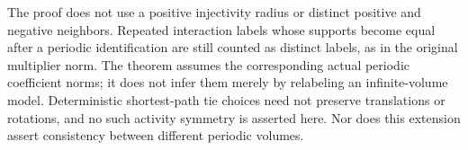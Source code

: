 \documentclass[11pt]{article}
\theoremstyle{remark}\newtheorem{remark}[theorem]{Remark}
\begin{document}
The proof does not use a positive injectivity radius or distinct positive
and negative neighbors. Repeated interaction labels whose supports become
equal after a periodic identification are still counted as distinct labels,
as in the original multiplier norm. The theorem assumes the corresponding
actual periodic coefficient norms; it does not infer them merely by
relabeling an infinite-volume model. Deterministic shortest-path tie choices
need not preserve translations or rotations, and no such activity symmetry
is asserted here. Nor does this extension assert consistency between
different periodic volumes.
\end{document}
